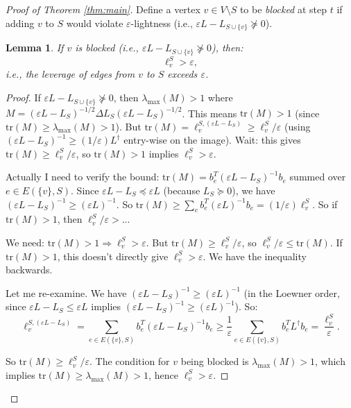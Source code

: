 \documentclass[12pt]{article}
\newtheorem{lemma}[theorem]{Lemma}
\begin{document}
\begin{proof}[Proof of Theorem \ref{thm:main}]
Define a vertex $v \in V \setminus S$ to be \emph{blocked} at step $t$ if adding $v$ to $S$ would violate $\varepsilon$-lightness (i.e., $\varepsilon L - L_{S \cup \{v\}} \not\succeq 0$).

\begin{lemma}\label{lem:blocked}
If $v$ is blocked (i.e., $\varepsilon L - L_{S \cup \{v\}} \not\succeq 0$), then:
\[
\ell_v^S > \varepsilon,
\]
i.e., the leverage of edges from $v$ to $S$ exceeds $\varepsilon$.
\end{lemma}

\begin{proof}
If $\varepsilon L - L_{S\cup\{v\}} \not\succeq 0$, then $\lambda_{\max}(M) > 1$ where $M = (\varepsilon L - L_S)^{-1/2} \Delta L_S (\varepsilon L - L_S)^{-1/2}$. This means $\mathrm{tr}(M) > 1$ (since $\mathrm{tr}(M) \geq \lambda_{\max}(M) > 1$). But $\mathrm{tr}(M) = \ell_v^{S, (\varepsilon L - L_S)} \geq \ell_v^S / \varepsilon$ (using $(\varepsilon L - L_S)^{-1} \geq (1/\varepsilon)L^\dagger$ entry-wise on the image). Wait: this gives $\mathrm{tr}(M) \geq \ell_v^S / \varepsilon$, so $\mathrm{tr}(M) > 1$ implies $\ell_v^S > \varepsilon$.

Actually I need to verify the bound: $\mathrm{tr}(M) = b_e^T (\varepsilon L - L_S)^{-1} b_e$ summed over $e \in E(\{v\}, S)$. Since $\varepsilon L - L_S \preceq \varepsilon L$ (because $L_S \succeq 0$), we have $(\varepsilon L - L_S)^{-1} \geq (\varepsilon L)^{-1}$. So $\mathrm{tr}(M) \geq \sum_e b_e^T (\varepsilon L)^{-1} b_e = (1/\varepsilon) \ell_v^S$. So if $\mathrm{tr}(M) > 1$, then $\ell_v^S/\varepsilon > ...$

We need: $\mathrm{tr}(M) > 1 \Rightarrow \ell_v^S > \varepsilon$. But $\mathrm{tr}(M) \geq \ell_v^S / \varepsilon$, so $\ell_v^S / \varepsilon \leq \mathrm{tr}(M)$. If $\mathrm{tr}(M) > 1$, this doesn't directly give $\ell_v^S > \varepsilon$. We have the inequality backwards.

Let me re-examine. We have $(\varepsilon L - L_S)^{-1} \geq (\varepsilon L)^{-1}$ (in the Loewner order, since $\varepsilon L - L_S \leq \varepsilon L$ implies $(\varepsilon L - L_S)^{-1} \geq (\varepsilon L)^{-1}$). So:
\[
\ell_v^{S, (\varepsilon L - L_S)} = \sum_{e \in E(\{v\},S)} b_e^T (\varepsilon L - L_S)^{-1} b_e \geq \frac{1}{\varepsilon} \sum_{e \in E(\{v\},S)} b_e^T L^\dagger b_e = \frac{\ell_v^S}{\varepsilon}.
\]

So $\mathrm{tr}(M) \geq \ell_v^S / \varepsilon$. The condition for $v$ being blocked is $\lambda_{\max}(M) > 1$, which implies $\mathrm{tr}(M) \geq \lambda_{\max}(M) > 1$, hence $\ell_v^S > \varepsilon$.


\end{proof}
\end{proof}
\end{document}
